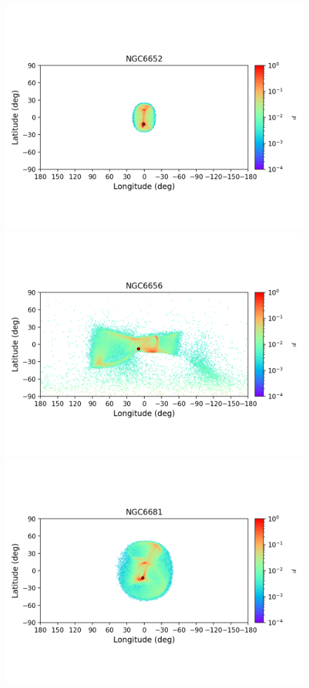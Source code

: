 \begin{figure}
        \includegraphics[clip=true, trim = 0mm 20mm 0mm 10mm, width=1\columnwidth]{images/error_plots_NGC6652.png}
        \includegraphics[clip=true, trim = 0mm 20mm 0mm 10mm, width=1\columnwidth]{images/error_plots_NGC6656.png}
        \includegraphics[clip=true, trim = 0mm 20mm 0mm 10mm, width=1\columnwidth]{images/error_plots_NGC6681.png}

\end{figure}
